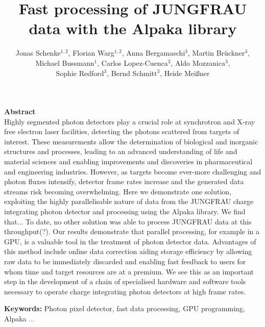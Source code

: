 \documentclass[a4paper]{article}
\begin{document}
\title{Fast processing of JUNGFRAU data with the Alpaka library}
\author{Jonas Schenke$^{1,2}$, 
Florian Warg$^{1,2}$, 
Anna Bergamaschi$^3$,
Martin Br\"uckner$^3$,\\
Michael Bussmann$^1$,
Carlos Lopez-Cuenca$^3$,
Aldo Mozzanica$^3$,\\
Sophie Redford$^3$,
Bernd Schmitt$^3$,
Heide Mei{\ss}ner}




\date{}

\renewcommand\Affilfont{\itshape}



\maketitle
{\bf Abstract}\\
Highly segmented photon detectors play a crucial role at synchrotron and X-ray free electron laser facilities, detecting the photons scattered from targets of interest. These measurements allow the determination of biological and inorganic structures and processes, leading to an advanced understanding of life and material sciences and enabling improvements and discoveries in pharmaceutical and engineering industries. However, as targets become ever-more challenging and photon fluxes intensify, detector frame rates increase and the generated data streams risk becoming overwhelming. Here we demonstrate one solution, exploiting the highly parallelisable nature of data from the JUNGFRAU charge integrating photon detector and processing using the Alpaka library. We find that... To date, no other solution was able to process JUNGFRAU data at this throughput(?). Our results demonstrate that parallel processing, for example in a GPU, is a valuable tool in the treatment of photon detector data. Advantages of this method include online data correction aiding storage efficiency by allowing raw data to be immediately discarded and enabling fast feedback to users for whom time and target resources are at a premium. We see this as an important step in the development of a chain of specialised hardware and software tools necessary to operate charge integrating photon detectors at high frame rates.

{\bf Keywords:} Photon pixel detector, fast data processing, GPU programming, Alpaka \textcolor{magenta}{...}
\end{document}
